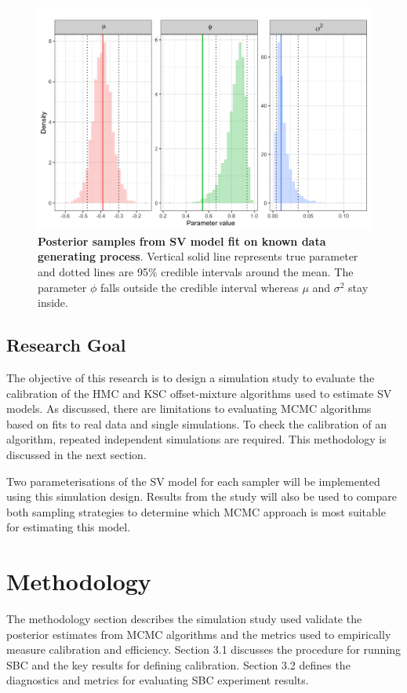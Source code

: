 \documentclass[12pt, a4paper]{article}
\begin{document}
    \begin{figure}[h]
        \centering
        \includegraphics[scale=0.1]{motivating_example/single_sim.png}
        \caption{\textbf{Posterior samples from SV model fit on known data generating process}. Vertical solid line represents true parameter and dotted lines are 95\% credible intervals around the mean. The parameter $\phi$ falls outside the credible interval whereas $\mu$ and $\sigma^2$ stay inside.}
    \end{figure}

\subsection{Research Goal}
    The objective of this research is to design a simulation study to evaluate the calibration of the HMC and KSC offset-mixture algorithms used to estimate SV models. As discussed, there are limitations to evaluating MCMC algorithms based on fits to real data and single simulations. To check the calibration of an algorithm, repeated independent simulations are required. This methodology is discussed in the next section. 

    Two parameterisations of the SV model for each sampler will be implemented using this simulation design. Results from the study will also be used to compare both sampling strategies to determine which MCMC approach is most suitable for estimating this model. 

\section{Methodology}
The methodology section describes the simulation study used validate the posterior estimates from MCMC algorithms and the metrics used to empirically measure calibration and efficiency. Section 3.1 discusses the procedure for running SBC and the key results for defining calibration. Section 3.2 defines the diagnostics and metrics for evaluating SBC experiment results.
\end{document}

